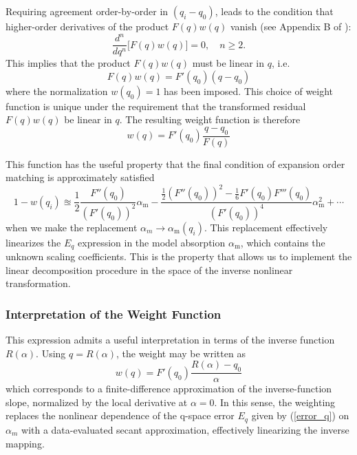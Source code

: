 \documentclass[12pt]{report}
\begin{document}
	Requiring agreement order-by-order in $(q_i - q_0)$, leads to the condition that higher-order derivatives of the product $F(q)w(q)$ vanish (see Appendix B of \cite{mine_acetone}):
	\begin{equation}
		\frac{d^n}{dq^n}\big[F(q)w(q)\big] = 0, \quad n \geq 2.
	\end{equation}
	This implies that the product $F(q)w(q)$ must be linear in $q$, i.e.
	\begin{equation}
		F(q)w(q) = F'(q_0)(q - q_0)
	\end{equation}
	where the normalization $w(q_0)=1$ has been imposed. This choice of weight function is unique under the requirement that the transformed residual $F(q)w(q)$ be linear in $q$. The resulting weight function is therefore
	\begin{equation} \label{weight_function}
		w(q) = F'(q_0)\frac{q - q_0}{F(q)}
	\end{equation}
	
	This function has the useful property that the final condition of expansion order matching is approximately satisfied
	\begin{equation}
		1 - w(q_i) \approxeq \frac{1}{2}\frac{F''(q_0)}{\left(F'(q_0)\right)^2}\alpha_\mathrm{m} - \frac{\frac{1}{2}\left(F''(q_0)\right)^2 - \frac{1}{6}F'(q_0) F'''(q_0)}{\left(F'(q_0)\right)^4}\alpha_\mathrm{m}^2 + \cdots
	\end{equation}
	when we make the replacement $\alpha_m \rightarrow \alpha_\mathrm{m}(q_i)$. This replacement effectively linearizes the $E_q$ expression in the model absorption $\alpha_\mathrm{m}$, which contains the unknown scaling coefficients. This is the property that allows us to implement the linear decomposition procedure in the space of the inverse nonlinear transformation.
	
	
	\subsubsection{Interpretation of the Weight Function}
	This expression admits a useful interpretation in terms of the inverse function $R(\alpha)$. Using $q = R(\alpha)$, the weight may be written as
	\begin{equation}
		w(q) = F'(q_0)\frac{R(\alpha) - q_0}{\alpha}
	\end{equation}
	which corresponds to a finite-difference approximation of the inverse-function slope, normalized by the local derivative at $\alpha = 0$. In this sense, the weighting replaces the nonlinear dependence of the q-space error $E_q$ given by (\ref{error_q}) on $\alpha_m$ with a data-evaluated secant approximation, effectively linearizing the inverse mapping.
	
\end{document}
